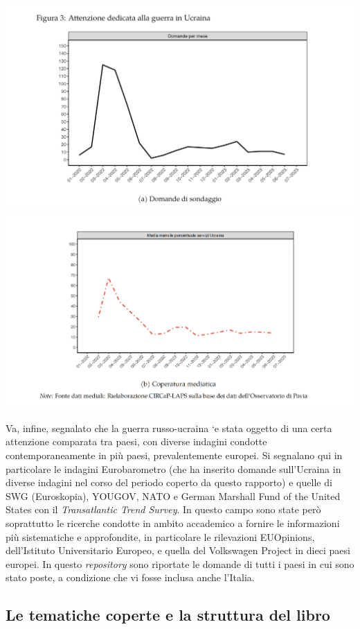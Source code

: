 \documentclass[
  openany]{book}
\begin{document}
\includegraphics{Images/Figura3.png}
\includegraphics{Images/Figura4.png}

Va, infine, segnalato che la guerra russo-ucraina `e stata oggetto di una certa attenzione
comparata tra paesi, con diverse indagini condotte contemporaneamente in più paesi,
prevalentemente europei. Si segnalano qui in particolare le indagini Eurobarometro
(che ha inserito domande sull'Ucraina in diverse indagini nel corso del periodo coperto
da questo rapporto) e quelle di SWG (Euroskopia), YOUGOV, NATO e German Marshall Fund of the United States con il \emph{Transatlantic Trend Survey}. In questo campo sono state però soprattutto le ricerche condotte in ambito accademico a fornire le informazioni
più sistematiche e approfondite, in particolare le rilevazioni EUOpinions, dell'Istituto Universitario Europeo, e quella del Volkswagen Project in dieci paesi europei. In questo \emph{repository} sono riportate le domande di tutti i paesi in cui sono stato poste, a condizione che vi fosse inclusa anche l'Italia.

\hypertarget{le-tematiche-coperte-e-la-struttura-del-libro}{%
\subsection{Le tematiche coperte e la struttura del libro}\label{le-tematiche-coperte-e-la-struttura-del-libro}}
\end{document}
